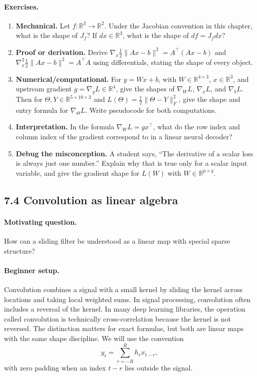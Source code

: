 \paragraph{Exercises.}
\begin{enumerate}[label=\textbf{7.3.\arabic*.}, leftmargin=*]
\item \textbf{Mechanical.} Let \(f:\mathbb{R}^3\to\mathbb{R}^2\). Under the Jacobian convention in this chapter, what is the shape of \(J_f\)? If \(dx\in\mathbb{R}^3\), what is the shape of \(df=J_fdx\)?
\item \textbf{Proof or derivation.} Derive \(\nabla_x \frac12\|Ax-b\|^2=A^\top(Ax-b)\) and \(\nabla_x^2\frac12\|Ax-b\|^2=A^\top A\) using differentials, stating the shape of every object.
\item \textbf{Numerical/computational.} For \(y=Wx+b\), with \(W\in\mathbb{R}^{4\times 3}\), \(x\in\mathbb{R}^3\), and upstream gradient \(g=\nabla_y L\in\mathbb{R}^4\), give the shapes of \(\nabla_W L\), \(\nabla_x L\), and \(\nabla_b L\). Then for \(\Theta,Y\in\mathbb{R}^{5\times 10\times 3}\) and \(L(\Theta)=\frac12\|\Theta-Y\|_F^2\), give the shape and entry formula for \(\nabla_\Theta L\). Write pseudocode for both computations.
\item \textbf{Interpretation.} In the formula \(\nabla_W L=gx^\top\), what do the row index and column index of the gradient correspond to in a linear neural decoder?
\item \textbf{Debug the misconception.} A student says, ``The derivative of a scalar loss is always just one number.'' Explain why that is true only for a scalar input variable, and give the gradient shape for \(L(W)\) with \(W\in\mathbb{R}^{p\times q}\).
\end{enumerate}

\subsection{7.4 Convolution as linear algebra}

\paragraph{Motivating question.}
How can a sliding filter be understood as a linear map with special sparse structure?

\paragraph{Beginner setup.}
Convolution combines a signal with a small kernel by sliding the kernel across locations and taking local weighted sums. In signal processing, convolution often includes a reversal of the kernel. In many deep learning libraries, the operation called convolution is technically cross-correlation because the kernel is not reversed. The distinction matters for exact formulas, but both are linear maps with the same shape discipline. We will use the convention
\[
y_t=\sum_{r=-R}^{R}h_r x_{t-r},
\]
with zero padding when an index \(t-r\) lies outside the signal.

